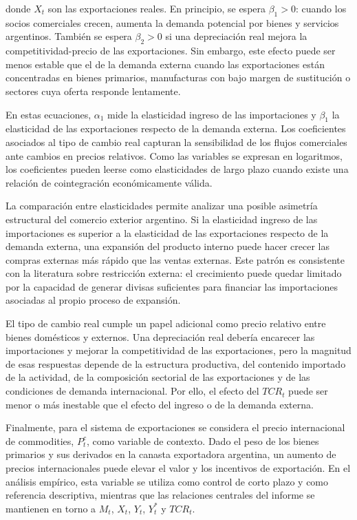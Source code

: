 \documentclass[11pt,a4paper]{article}
\begin{document}
	donde $X_t$ son las exportaciones reales. En principio, se espera $\beta_1>0$:
	cuando los socios comerciales crecen, aumenta la demanda potencial por bienes y
	servicios argentinos. También se espera $\beta_2>0$ si una depreciación real
	mejora la competitividad-precio de las exportaciones. Sin embargo, este efecto
	puede ser menos estable que el de la demanda externa cuando las exportaciones
	están concentradas en bienes primarios, manufacturas con bajo margen de
	sustitución o sectores cuya oferta responde lentamente.

	En estas ecuaciones, $\alpha_1$ mide la elasticidad ingreso de las
	importaciones y $\beta_1$ la elasticidad de las exportaciones respecto de la
	demanda externa. Los coeficientes asociados al tipo de cambio real capturan la
	sensibilidad de los flujos comerciales ante cambios en precios relativos. Como
	las variables se expresan en logaritmos, los coeficientes pueden leerse como
	elasticidades de largo plazo cuando existe una relación de cointegración
	económicamente válida.

	La comparación entre elasticidades permite analizar una posible asimetría
	estructural del comercio exterior argentino. Si la elasticidad ingreso de las
	importaciones es superior a la elasticidad de las exportaciones respecto de la
	demanda externa, una expansión del producto interno puede hacer crecer las
	compras externas más rápido que las ventas externas. Este patrón es consistente
	con la literatura sobre restricción externa: el crecimiento puede quedar
	limitado por la capacidad de generar divisas suficientes para financiar las
	importaciones asociadas al propio proceso de expansión.

	El tipo de cambio real cumple un papel adicional como precio relativo entre
	bienes domésticos y externos. Una depreciación real debería encarecer las
	importaciones y mejorar la competitividad de las exportaciones, pero la magnitud
	de esas respuestas depende de la estructura productiva, del contenido importado
	de la actividad, de la composición sectorial de las exportaciones y de las
	condiciones de demanda internacional. Por ello, el efecto del $TCR_t$ puede ser
	menor o más inestable que el efecto del ingreso o de la demanda externa.

	Finalmente, para el sistema de exportaciones se considera el precio
	internacional de commodities, $P_t^c$, como variable de contexto. Dado el peso
	de los bienes primarios y sus derivados en la canasta exportadora argentina, un
	aumento de precios internacionales puede elevar el valor y los incentivos de
	exportación. En el análisis empírico, esta variable se utiliza como control de
	corto plazo y como referencia descriptiva, mientras que las relaciones centrales
	del informe se mantienen en torno a \(M_t\), \(X_t\), \(Y_t\), \(Y_t^*\) y
	\(TCR_t\).
\end{document}
